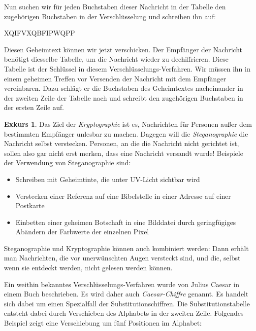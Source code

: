 \documentclass[a4paper,ngerman,12pt]{scrartcl}
\theoremstyle{definition}
\newtheorem*{exk}{Exkurs}
\newenvironment{exkurs}{\begin{shaded}\begin{exk}}{\end{exk}\end{shaded}}
\begin{document}
Nun suchen wir für jeden Buchstaben dieser Nachricht in der Tabelle den zugehörigen Buchstaben in der Verschlüsselung und schreiben ihn auf:

\begin{center}
  XQIFVXQBFIPWQPP
\end{center}

Diesen Geheimtext können wir jetzt verschicken. Der Empfänger der Nachricht benötigt diesselbe Tabelle, um die Nachricht wieder zu dechiffrieren. Diese Tabelle ist der Schlüssel in diesem Verschlüsselungs-Verfahren. Wir müssen ihn in einem geheimen Treffen vor Versenden der Nachricht mit dem Empfänger vereinbaren. Dazu schlägt er die Buchstaben des Geheimtextes nacheinander in der zweiten Zeile der Tabelle nach und schreibt den zugehörigen Buchstaben in der ersten Zeile auf.

\begin{exkurs}
  Das Ziel der \emph{Kryptographie} ist es, Nachrichten für Personen außer dem bestimmten Empfänger unlesbar zu machen. Dagegen will die \emph{Steganographie} die Nachricht selbst verstecken. Personen, an die die Nachricht nicht gerichtet ist, sollen also gar nicht erst merken, dass eine Nachricht versandt wurde! Beispiele der Verwendung von Steganographie sind:
  \begin{itemize}
    \item Schreiben mit Geheimtinte, die unter UV-Licht sichtbar wird
    \item Verstecken einer Referenz auf eine Bibelstelle in einer Adresse auf einer Postkarte
    \item Einbetten einer geheimen Botschaft in eine Bilddatei durch geringfügiges Abändern der Farbwerte der einzelnen Pixel
  \end{itemize}
  Steganographie und Kryptographie können auch kombiniert werden: Dann erhält man Nachrichten, die vor unerwünschten Augen versteckt sind, und die, selbst wenn sie entdeckt werden, nicht gelesen werden können.
\end{exkurs}

Ein weithin bekanntes Verschlüsselungs-Verfahren wurde von Julius Caesar in einem Buch beschrieben. Es wird daher auch \emph{Caesar-Chiffre} genannt. Es handelt sich dabei um einen Spezialfall der Substitutionschiffren. Die Substitutionstabelle entsteht dabei durch Verschieben des Alphabets in der zweiten Zeile. Folgendes Beispiel zeigt eine Verschiebung um fünf Positionen im Alphabet:

\begin{center}
\end{center}
\end{document}
